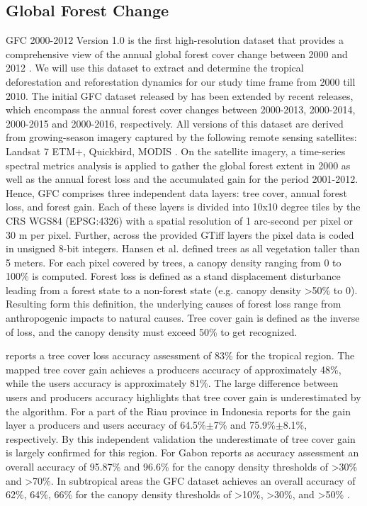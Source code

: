 	\subsection{Global Forest Change}
	\label{subsec:methods_gfc}
		\ac{GFC} 2000-2012 Version 1.0 is the first high-resolution dataset that provides a comprehensive view of the annual global forest cover change between 2000 and 2012 \citep{Hansen2013,Li2017}. We will use this dataset to extract and determine the tropical deforestation and reforestation dynamics for our study time frame from 2000 till 2010. The initial \ac{GFC} dataset released by \citet{Hansen2013} has been extended by recent releases, which encompass the annual forest cover changes between 2000-2013, 2000-2014, 2000-2015 and 2000-2016, respectively. All versions of this dataset are derived from growing-season imagery captured by the following remote sensing satellites: Landsat 7 ETM+, Quickbird, MODIS \citep{Hansen2013}. On the satellite imagery, a time-series spectral metrics analysis is applied to gather the global forest extent in 2000 as well as the annual forest loss and the accumulated gain for the period 2001-2012. Hence, \ac{GFC} comprises three independent data layers: tree cover, annual forest loss, and forest gain. Each of these layers is divided into 10x10 degree tiles by the \ac{CRS} \ac{WGS84} (EPSG:4326) with a spatial resolution of 1 arc-second per pixel or 30 m per pixel. Further, across the provided \ac{GTiff} layers the pixel data is coded in unsigned 8-bit integers. Hansen et al. defined trees as all vegetation taller than 5 meters. For each pixel covered by trees, a canopy density ranging from 0 to 100\% is computed. Forest loss is defined as a stand displacement disturbance leading from a forest state to a non-forest state (e.g. canopy density >50\% to 0). Resulting form this definition, the underlying causes of forest loss range from anthropogenic impacts to natural causes. Tree cover gain is defined as the inverse of loss, and the canopy density must exceed 50\% to get recognized.

		\citet{Hansen2013} reports a tree cover loss accuracy assessment of 83\% for the tropical region. The mapped tree cover gain achieves a producers accuracy of approximately 48\%, while the users accuracy is approximately 81\%. The large difference between users and producers accuracy highlights that tree cover gain is underestimated by the algorithm. For a part of the Riau province in Indonesia \citet{Arjasakusuma2018} reports for the gain layer a producers and users accuracy of 64.5\%$\pm$7\% and 75.9\%$\pm$8.1\%, respectively. By this independent validation the underestimate of tree cover gain is largely confirmed for this region. For Gabon \citet{Sannier2016} reports as accuracy assessment an overall accuracy of 95.87\% and 96.6\% for the canopy density thresholds of >30\% and >70\%. In subtropical areas the \ac{GFC} dataset achieves an overall accuracy of 62\%, 64\%, 66\% for the canopy density thresholds of >10\%, >30\%, and >50\% \citep{McRoberts2016}.


